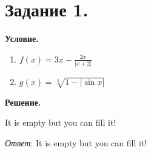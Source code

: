 \section{Задание 1.}

\textbf{Условие.}\\
\begin{enumerate}
    \item $\displaystyle f(x) = 3x - \frac{2x}{|x + 2|}$
    \item $\displaystyle g(x) = \sqrt[3]{1 - |\sin{x}|}$
\end{enumerate}
\vspace{10mm}
\textbf{Решение.}

It is empty but you can fill it!

\textit{Ответ}: It is empty but you can fill it!
\clearpage

